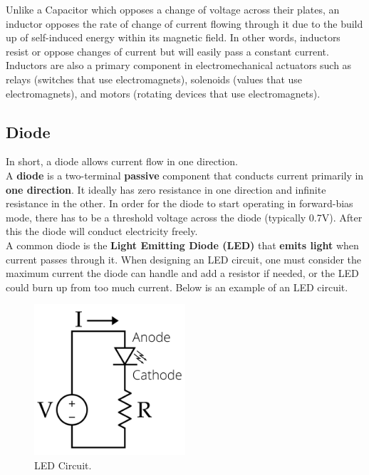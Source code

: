 \documentclass{article}
\begin{document}
Unlike a Capacitor which opposes a change of voltage across their plates, an inductor opposes the rate of change of current flowing through it due to the build up of self-induced energy within its magnetic field. In other words, inductors resist or oppose changes of current but will easily pass a constant current.\\

Inductors are also a primary component in electromechanical actuators such as relays (switches that use electromagnets), solenoids (values that use electromagnets), and motors (rotating devices that use electromagnets). 

\subsection{Diode}

In short, a diode allows current flow in one direction.\\

A \textbf{diode} is a two-terminal \textbf{passive} component that conducts current primarily in \textbf{one direction}. It ideally has zero resistance in one direction and infinite resistance in the other. In order for the diode to start operating in forward-bias mode, there has to be a threshold voltage across the diode (typically 0.7V). After this the diode will conduct electricity freely. \\

A common diode is the \textbf{Light Emitting Diode (LED)} that \textbf{emits light} when current passes through it. When designing an LED circuit, one must consider the maximum current the diode can handle and add a resistor if needed, or the LED could burn up from too much current. Below is an example of an LED circuit.

\begin{figure} [h]
    \centering
    \includegraphics[width=0.5\textwidth]{img/LED_Circuit.png}
    \caption{LED Circuit.}
    \label{fig:LED_ckt}
\end{figure}
\end{document}
